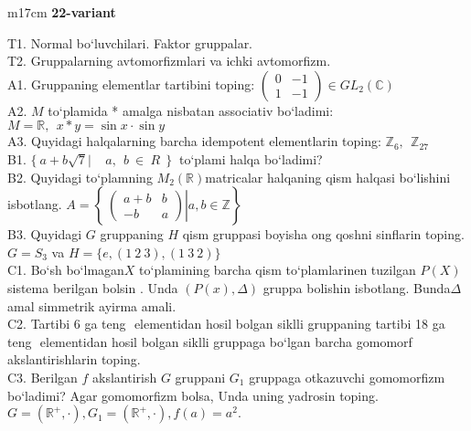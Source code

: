 \documentclass{article}
\begin{document}
\begin{tabular}{m{17cm}}
\textbf{22-variant}
\newline

T1. Normal bo`luvchilari. Faktor gruppalar. \\
T2. Gruppalarning avtomorfizmlari va ichki avtomorfizm. \\
A1. Gruppaning elementlar tartibini toping: \(\begin{pmatrix}
0 & - 1 \\
1 & - 1
\end{pmatrix} \in GL_{2}(\mathbb{C})\) \\
A2. \(M\) to`plamida * amalga nisbatan associativ bo`ladimi: \(M\mathbb{= R},\ \ x*y = \sin x \cdot \sin y\) \\
A3. Quyidagi halqalarning barcha idempotent elementlarin toping: \(\mathbb{Z}_{6},\ \ \mathbb{Z}_{27}\) \\
B1. \(\{\ a + b\sqrt{7}\left| \ \ \ \ \ a,\ \ b\  \in \ R\ \ \} \right.\ \) to`plami halqa bo`ladimi? \\
B2. Quyidagi to`plamning \(M_{2}(\mathbb{R})\)matricalar halqaning qism halqasi bo`lishini isbotlang. \(A = \left\{ \left. \ \begin{pmatrix}
a + b & b \\
 - b & a
\end{pmatrix} \right|a,b\mathbb{\in Z} \right\}\) \\
B3. Quyidagi \(G\) gruppaning \(H\) qism gruppasi boyisha o\textquotesingle ng qo\textquotesingle shni sinflarin toping. \(G = S_{3}\) va \(H = \{ e,(1\ 2\ 3),(1\ 3\ 2)\}\) \\
C1. Bo`sh bo`lmagan\(X\) to`plamining barcha qism to`plamlarinen tuzilgan \(P(X)\) sistema berilgan bo\textquotesingle lsin . Unda \((P(x),\Delta)\) gruppa bolishin isbotlang. Bunda\(\Delta\) amal simmetrik ayirma amali. \\
C2. Tartibi 6 ga teng \(< a >\) elementidan hosil bo\textquotesingle lgan siklli gruppaning tartibi 18 ga teng \(< b >\) elementidan hosil bo\textquotesingle lgan siklli gruppaga bo`lgan barcha gomomorf akslantirishlarin toping. \\
C3. Berilgan \(f\) akslantirish \(G\) gruppani \(G_{1}\) gruppaga o\textquotesingle tkazuvchi gomomorfizm bo`ladimi? Agar gomomorfizm bolsa, Unda uning yadrosin toping. \(G = \left( \mathbb{R}^{+}, \cdot \right),G_{1} = \left( \mathbb{R}^{+}, \cdot \right),f(a) = a^{2}.\) \\

\end{tabular}
\vspace{1cm}
\end{document}
